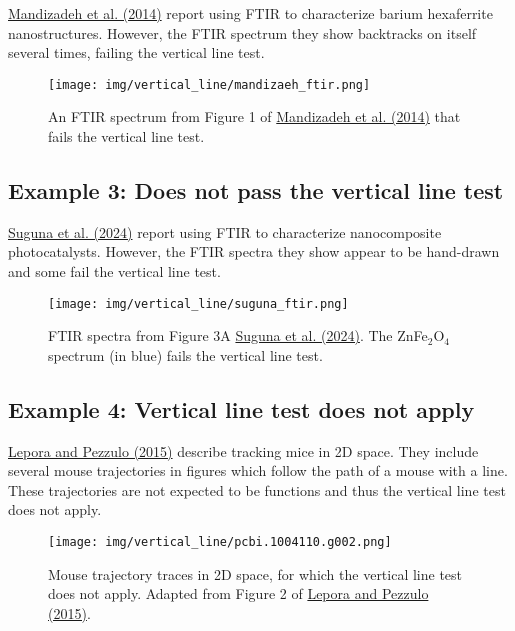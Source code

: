 \documentclass[letterpaper, 12pt]{article}
\begin{document}
\href{https://doi.org/10.1016/j.ceramint.2014.07.091}{Mandizadeh et al. (2014)} report using FTIR to characterize barium hexaferrite nanostructures. However, the FTIR spectrum they show backtracks on itself several times, failing the vertical line test.

\begin{figure}[h!tbp]
    \centering
    \texttt{[image: img/vertical\_line/mandizaeh\_ftir.png]}
    \caption*{An FTIR spectrum from Figure 1 of \href{https://doi.org/10.1016/j.ceramint.2014.07.091}{Mandizadeh et al. (2014)} that fails the vertical line test.}
\end{figure}

\pagebreak

\subsection*{Example 3: Does not pass the vertical line test}

\href{https://doi.org/10.1007/s10854-024-13064-8}{Suguna et al. (2024)} report using FTIR to characterize nanocomposite photocatalysts. However, the FTIR spectra they show appear to be hand-drawn and some fail the vertical line test.

\begin{figure}[h!tbp]
    \centering
    \texttt{[image: img/vertical\_line/suguna\_ftir.png]}
    \caption*{FTIR spectra from Figure 3A \href{https://doi.org/10.1007/s10854-024-13064-8}{Suguna et al. (2024)}. The ZnFe$_2$O$_4$ spectrum (in blue) fails the vertical line test.}
\end{figure}

\pagebreak

\subsection*{Example 4: Vertical line test does not apply}

\href{https://doi.org/10.1371/journal.pcbi.1004110}{Lepora and Pezzulo (2015)} describe tracking mice in 2D space. They include several mouse trajectories in figures which follow the path of a mouse with a line. These trajectories are not expected to be functions and thus the vertical line test does not apply.

\begin{figure}[h!tbp]
    \centering
    \texttt{[image: img/vertical\_line/pcbi.1004110.g002.png]}
    \caption*{Mouse trajectory traces in 2D space, for which the vertical line test does not apply. Adapted from Figure 2 of \href{https://doi.org/10.1371/journal.pcbi.1004110}{Lepora and Pezzulo (2015)}.}
\end{figure}
\end{document}

